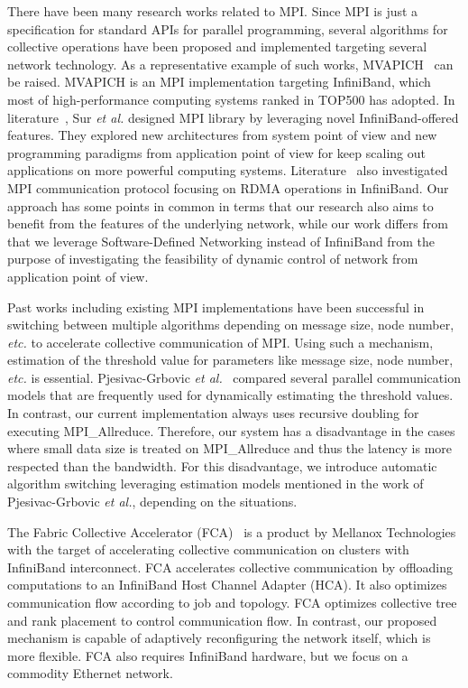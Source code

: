 There have been many research works related to MPI\@. Since MPI is just a
specification for standard APIs for parallel programming, several algorithms
for collective operations have been proposed and implemented targeting several
network technology. As a representative example of such works,
MVAPICH~\autocite{mvapich} can be raised. MVAPICH is an MPI implementation
targeting InfiniBand, which most of high-performance computing systems ranked
in TOP500 has adopted. In literature~\autocite{PjesivacGrbovic2011}, Sur \emph{et
al.} designed MPI library by leveraging novel InfiniBand-offered features.
They explored new architectures from system point of view and new programming
paradigms from application point of view for keep scaling out applications on
more powerful computing systems. Literature~\autocite{Jiuxing2004} also
investigated MPI communication protocol focusing on RDMA operations in
InfiniBand. Our approach has some points in common in terms that our research
also aims to benefit from the features of the underlying network, while our
work differs from that we leverage Software-Defined Networking instead of
InfiniBand from the purpose of investigating the feasibility of dynamic
control of network from application point of view.

Past works including existing MPI implementations have been successful
in switching between multiple algorithms depending on message size, node
number, \emph{etc.} to accelerate collective communication of MPI\@. Using
such a mechanism, estimation of the threshold value for parameters like
message size, node number, \emph{etc.} is essential. Pjesivac-Grbovic \emph{et
al.}~\autocite{PjesivacGrbovic} compared several parallel communication models
that are frequently used for dynamically estimating the threshold values. In
contrast, our current implementation always uses recursive doubling for
executing MPI\_Allreduce. Therefore, our system has a disadvantage in the
cases where small data size is treated on MPI\_Allreduce and thus the latency
is more respected than the bandwidth. For this disadvantage, we introduce
automatic algorithm switching leveraging estimation models mentioned in the
work of Pjesivac-Grbovic \emph{et al.}, depending on the situations.

The Fabric Collective Accelerator (FCA)~\autocite{fca} is a product by
Mellanox Technologies with the target of accelerating collective
communication on clusters with InfiniBand interconnect. FCA accelerates
collective communication by offloading computations to an InfiniBand
Host Channel Adapter (HCA). It also optimizes communication flow
according to job and topology. FCA optimizes collective tree and rank
placement to control communication flow. In contrast, our proposed
mechanism is capable of adaptively reconfiguring the network itself,
which is more flexible. FCA also requires InfiniBand hardware, but we
focus on a commodity Ethernet network.

